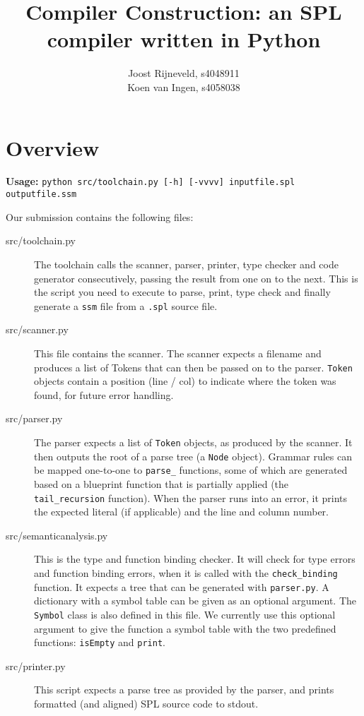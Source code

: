 \documentclass[a4paper]{article}
\title{Compiler Construction: an SPL compiler written in Python}
\author{Joost Rijneveld, s4048911\\Koen van Ingen, s4058038}
\date{}
\begin{document}
\maketitle

\section{Overview}
{\bf Usage:} {\tt python src/toolchain.py [-h] [-vvvv] inputfile.spl outputfile.ssm}

Our submission contains the following files:

\begin{description}
        \item[src/toolchain.py] The toolchain calls the scanner, parser, printer, type checker and code generator consecutively, passing the result from one on to the next. This is the script you need to execute to parse, print, type check and finally generate a {\tt ssm} file from a {\tt .spl} source file.
        \item[src/scanner.py] This file contains the scanner. The scanner expects a filename and produces a list of Tokens that can then be passed on to the parser. {\tt Token} objects contain a position (line / col) to indicate where the token was found, for future error handling.
        \item[src/parser.py] The parser expects a list of {\tt Token} objects, as produced by the scanner. It then outputs the root of a parse tree (a {\tt Node} object). Grammar rules can be mapped one-to-one to {\tt parse\_} functions, some of which are generated based on a blueprint function that is partially applied (the {\tt tail\_recursion} function). When the parser runs into an error, it prints the expected literal (if applicable) and the line and column number.
        \item[src/semanticanalysis.py] This is the type and function binding checker. It will check for type errors and function binding errors, when it is called with the {\tt check\_binding} function. It expects a tree that can be generated with {\tt parser.py}. A dictionary with a symbol table can be given as an optional argument. The {\tt Symbol} class is also defined in this file. We currently use this optional argument to give the function a symbol table with the two predefined functions: {\tt isEmpty} and {\tt print}. 
        \item[src/printer.py] This script expects a parse tree as provided by the parser, and prints formatted (and aligned) SPL source code to stdout.

\end{description}
\end{document}
